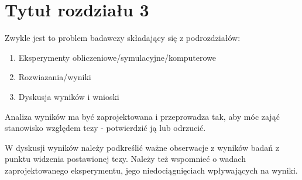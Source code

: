 \section{Tytuł rozdziału 3}

Zwykle jest to problem badawczy składający się z podrozdziałów:
\begin{enumerate}
    \item Eksperymenty obliczeniowe/symulacyjne/komputerowe
    \item Rozwiazania/wyniki
    \item Dyskusja wyników i wnioski
\end{enumerate}

Analiza wyników ma być zaprojektowana i przeprowadza tak, aby móc zająć stanowisko względem tezy - potwierdzić ją lub odrzucić.

W dyskusji wyników należy podkreślić ważne obserwacje z wyników badań z punktu widzenia postawionej tezy. Należy też wspomnieć o wadach zaprojektowanego eksperymentu, jego niedociągnięciach wpływających na wyniki. 